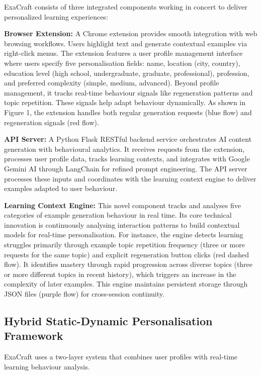 \documentclass[sigconf]{acmart}
\begin{document}
ExaCraft consists of three integrated components working in concert to deliver personalized learning experiences:

\textbf{Browser Extension:} A Chrome extension provides smooth integration with web browsing workflows. Users highlight text and generate contextual examples via right-click menus. The extension features a user profile management interface where users specify five personalisation fields: name, location (city, country), education level (high school, undergraduate, graduate, professional), profession, and preferred complexity (simple, medium, advanced). Beyond profile management, it tracks real-time behaviour signals like regeneration patterns and topic repetition. These signals help adapt behaviour dynamically. As shown in Figure 1, the extension handles both regular generation requests (blue flow) and regeneration signals (red flow).

\textbf{API Server:} A Python Flask RESTful backend service orchestrates AI content generation with behavioural analytics. It receives requests from the extension, processes user profile data, tracks learning contexts, and integrates with Google Gemini AI through LangChain for refined prompt engineering. The API server processes these inputs and coordinates with the learning context engine to deliver examples adapted to user behaviour.

\textbf{Learning Context Engine:} This novel component tracks and analyses five categories of example generation behaviour in real time. Its core technical innovation is continuously analysing interaction patterns to build contextual models for real-time personalisation. For instance, the engine detects learning struggles primarily through example topic repetition frequency (three or more requests for the same topic) and explicit regeneration button clicks (red dashed flow). It identifies mastery through rapid progression across diverse topics (three or more different topics in recent history), which triggers an increase in the complexity of later examples. This engine maintains persistent storage through JSON files (purple flow) for cross-session continuity.

\subsection{Hybrid Static-Dynamic Personalisation Framework}

ExaCraft uses a two-layer system that combines user profiles with real-time learning behaviour analysis.
\end{document}
